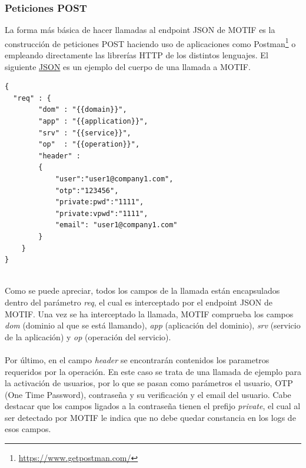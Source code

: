 \documentclass[a4paper, 12pt]{article}
\newenvironment{code}{\captionsetup{type=listing}}{}
\begin{document}
\subsubsection{Peticiones POST}
\label{sec-2-3-1}
La forma más básica de hacer llamadas al endpoint JSON de MOTIF es la construcción de peticiones POST haciendo uso
de aplicaciones como Postman\footnote{\url{https://www.getpostman.com/}} o empleando directamente las librerías HTTP de los distintos lenguajes.
El siguiente \hyperref[code:jsonmotif]{JSON} es un ejemplo del cuerpo de una llamada a MOTIF.
\\
\begin{code}
\label{code:jsonmotif}
\begin{verbatim}
{
  "req" : {
        "dom" : "{{domain}}",
        "app" : "{{application}}",
        "srv" : "{{service}}",
        "op"  : "{{operation}}",
        "header" :
        {
            "user":"user1@company1.com",
            "otp":"123456",
            "private:pwd":"1111",
            "private:vpwd":"1111",
            "email": "user1@company1.com"
        }
    }
}
\end{verbatim}
\end{code}
\bigbreak
\\
Como se puede apreciar, todos los campos de la llamada están encapsulados dentro del parámetro \emph{req}, el cual
es interceptado por el endpoint JSON de MOTIF. Una vez se ha interceptado la llamada, MOTIF comprueba los campos
\emph{dom} (dominio al que se está llamando), \emph{app} (aplicación del dominio), \emph{srv} (servicio de la aplicación) y \emph{op}
(operación del servicio).
\\
\\
Por último, en el campo \emph{header} se encontrarán contenidos los parametros requeridos por la operación. En este caso
se trata de una llamada de ejemplo para la activación de usuarios, por lo que se pasan como parámetros el usuario,
OTP (One Time Password), contraseña y su verificación y el email del usuario. Cabe destacar que los campos ligados a
la contraseña tienen el prefijo \emph{private}, el cual al ser detectado por MOTIF le indica que no debe quedar constancia
en los logs de esos campos.
\end{document}
